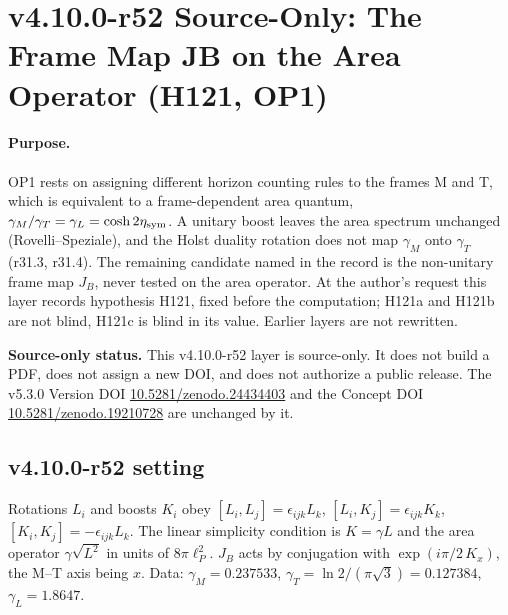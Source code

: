\clearpage
\section*{v4.10.0-r52 Source-Only: The Frame Map JB on the Area Operator (H121, OP1)}
\label{sec:v4100-r52-jb-area}

\paragraph{Purpose.}
OP1 rests on assigning different horizon counting rules to the frames M and T, which is equivalent to a frame-dependent area quantum,
\(\gamma_M/\gamma_T=\gamma_L=\cosh2\eta_{\rm sym}\).  A unitary boost leaves the area spectrum unchanged (Rovelli--Speziale), and the Holst duality rotation does not
map \(\gamma_M\) onto \(\gamma_T\) (r31.3, r31.4).  The remaining candidate named in the record is the non-unitary frame map \(J_B\), never tested on the
area operator.  At the author's request this layer records hypothesis H121, fixed before the computation; H121a and H121b are not blind, H121c
is blind in its value.  Earlier layers are not rewritten.

\noindent\textbf{Source-only status.}
This v4.10.0-r52 layer is source-only.  It does not build a PDF, does not assign a new DOI,
and does not authorize a public release.  The v5.3.0 Version DOI
\href{https://doi.org/10.5281/zenodo.24434403}{10.5281/zenodo.24434403} and the Concept DOI
\href{https://doi.org/10.5281/zenodo.19210728}{10.5281/zenodo.19210728} are unchanged by it.

\subsection*{v4.10.0-r52 setting}
\label{subsec:v4100-r52-setting}

Rotations \(L_i\) and boosts \(K_i\) obey \([L_i,L_j]=\epsilon_{ijk}L_k\), \([L_i,K_j]=\epsilon_{ijk}K_k\), \([K_i,K_j]=-\epsilon_{ijk}L_k\).  The linear simplicity condition is \(K=\gamma L\) and the area
operator \(\gamma\sqrt{L^2}\) in units of \(8\pi\ell_P^2\).  \(J_B\) acts by conjugation with \(\exp(i\pi/2\,K_x)\), the M--T axis being \(x\).  Data: \(\gamma_M=0.237533\), \(\gamma_T=\ln2/(\pi\sqrt3)=0.127384\),
\(\gamma_L=1.8647\).


